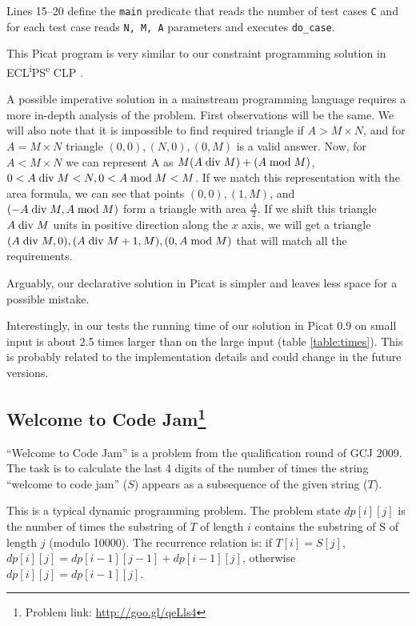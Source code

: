 \documentclass{llncs}
\begin{document}
Lines 15--20 define the \texttt{main} predicate that reads the number of test cases \texttt{C} and for each test case reads \texttt{N, M, A} parameters and executes \texttt{do\_case}.

This Picat program is very similar to our constraint programming solution in ECL\textsuperscript{i}PS\textsuperscript{e} CLP \cite{gcj-eclipse-arxiv}.

A possible imperative solution in a mainstream programming language requires a more in-depth analysis of the problem.
First observations will be the same. We will also note that it is impossible to find required triangle
if $A > M \times N$, and for $A = M \times N$ triangle $(0,0), (N,0), (0,M)$ is a valid answer.
Now, for $A < M \times N$ we can represent A as $M(A \bdiv M) + (A \bmod M)$, $0 < A \bdiv M < N, 0 < A \bmod M < M$.
If we match this representation with the area formula, we can see that points $(0, 0), (1, M)$, and $(- A \bdiv M, A \bmod M)$
form a triangle with area $\frac{A}{2}$. If we shift this triangle $A \bdiv M$ units in positive direction along the $x$ axis, we will get
a triangle $(A \bdiv M, 0), (A \bdiv M + 1, M), (0, A \bmod M)$ that will match all the requirements.

Arguably, our declarative solution in Picat is simpler and leaves less space for a possible mistake.

Interestingly, in our tests the running time of our solution in Picat 0.9 on small input is about 2.5 times larger than on the large input (table \ref{table:times}).
This is probably related to the implementation details and could change in the future versions.

\subsection*{Welcome to Code Jam\footnote{Problem link: \url{http://goo.gl/qeLls4}}}

``Welcome to Code Jam'' is a problem from the qualification round of GCJ 2009.
The task is to calculate the last 4 digits of the number of times the string ``welcome to code jam'' ($S$) appears as a subsequence of the given string ($T$).

This is a typical dynamic programming problem.
The problem state $dp[i][j]$ is the number of times the substring of $T$ of length $i$ contains the substring of S of length $j$ (modulo 10000).
The recurrence relation is: if $T[i] = S[j]$, $dp[i][j] = dp[i - 1][j - 1] + dp[i - 1][j]$, otherwise $dp[i][j] = dp[i - 1][j]$.
\end{document}

